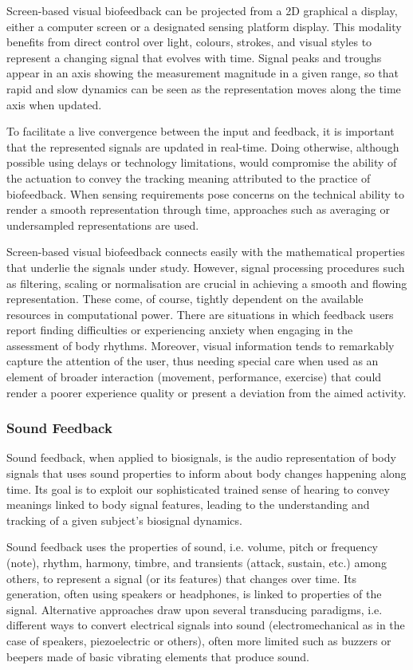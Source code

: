 Screen-based visual biofeedback can be projected from a 2D graphical a display, either a computer screen or a designated sensing platform display. This modality benefits from direct control over light, colours, strokes, and visual styles to represent a changing signal that evolves with time. Signal peaks and troughs appear in an axis showing the measurement magnitude in a given range, so that rapid and slow dynamics can be seen as the representation moves along the time axis when updated. 

To facilitate a live convergence between the input and feedback, it is important that the represented signals are updated in real-time. Doing otherwise, although possible using delays or technology limitations, would compromise the ability of the actuation to convey the tracking meaning attributed to the practice of biofeedback. When sensing requirements pose concerns on the technical ability to render a smooth representation through time, approaches such as averaging or undersampled representations are used. 

Screen-based visual biofeedback connects easily with the mathematical properties that underlie the signals under study. However, signal processing procedures such as filtering, scaling or normalisation are crucial in achieving a smooth and flowing representation. These come, of course, tightly dependent on the available resources in computational power.
There are situations in which feedback users report finding difficulties or experiencing anxiety when engaging in the assessment of body rhythms. Moreover, visual information tends to remarkably capture the attention of the user, thus needing special care when used as an element of broader interaction (movement, performance, exercise) that could render a poorer experience quality or present a deviation from the aimed activity.

\subsubsection{Sound Feedback}

Sound feedback, when applied to biosignals, is the audio representation of body signals that uses sound properties to inform about body changes happening along time. Its goal is to exploit our sophisticated trained sense of hearing to convey meanings linked to body signal features, leading to the understanding and tracking of a given subject’s biosignal dynamics.

Sound feedback uses the properties of sound, i.e. volume, pitch or frequency (note), rhythm, harmony, timbre, and transients (attack, sustain, etc.) among others, to represent a signal (or its features) that changes over time. Its generation, often using speakers or headphones, is linked to properties of the signal. Alternative approaches draw upon several transducing paradigms, i.e. different ways to convert electrical signals into sound (electromechanical as in the case of speakers, piezoelectric or others), often more limited such as buzzers or beepers made of basic vibrating elements that produce sound. 

